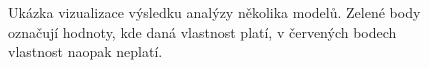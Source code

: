 \documentclass{parasim}
\begin{document}
\begin{figure}[h!]
	\centering
	\begin{subfigure}[b]{0.3\textwidth}
		\centering
	\end{subfigure}
	\begin{subfigure}[b]{0.3\textwidth}
		\centering
	\end{subfigure}
	\begin{subfigure}[b]{0.3\textwidth}
		\centering
	\end{subfigure}
	\caption{Ukázka vizualizace výsledku analýzy několika modelů. Zelené body označují hodnoty, kde daná vlastnost platí, v červených bodech vlastnost naopak neplatí.}
\end{figure}
\end{document}
